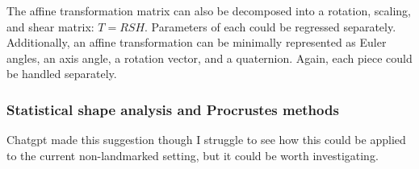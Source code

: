\documentclass[11pt]{article}
\theoremstyle{definition}
\begin{document}
The affine transformation matrix can also be decomposed into a rotation, scaling, and shear matrix: $T = RSH$. Parameters of each could be regressed separately. Additionally, an affine transformation can be minimally represented as Euler angles, an axis angle, a rotation vector, and a quaternion. Again, each piece could be handled separately. 

\subsubsection{Statistical shape analysis and Procrustes methods}

Chatgpt made this suggestion though I struggle to see how this could be applied to the current non-landmarked setting, but it could be worth investigating.


\newpage
\end{document}
